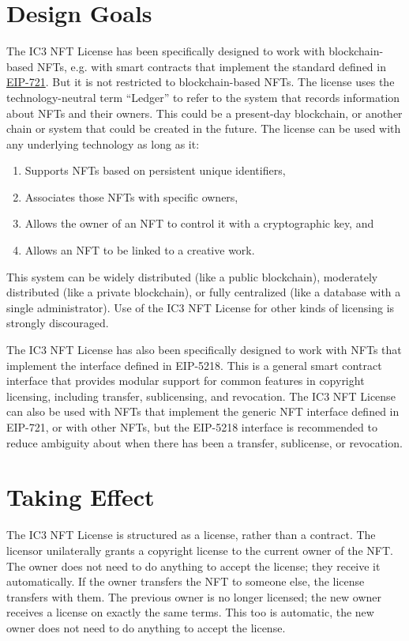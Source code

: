 \documentclass{article}
\newcommand{\eiplicense}{EIP-5218\xspace}
\newcommand{\iccclicense}{IC3 NFT License\xspace}
\begin{document}
\section{Design Goals}


The \iccclicense has been specifically designed to work with blockchain-based NFTs, e.g. with smart contracts that implement the standard defined in \href{https://eips.ethereum.org/EIPS/eip-721}{EIP-721}. But it is not restricted to blockchain-based NFTs. The license uses the technology-neutral term ``Ledger'' to refer to the system that records information about NFTs and their owners. This could be a present-day blockchain, or another chain or system that could be created in the future. The license can be used with any underlying technology as long as it:
\begin{enumerate}
\item Supports NFTs based on persistent unique identifiers, 
\item Associates those NFTs with specific owners,
\item Allows the owner of an NFT to control it with a cryptographic key, and 
\item Allows an NFT to be linked to a creative work. 
\end{enumerate}
This system can be widely distributed (like a public blockchain), moderately distributed (like a private blockchain), or fully centralized (like a database with a single administrator). Use of the \iccclicense for other kinds of licensing is strongly discouraged.

The \iccclicense has also been specifically designed to work with NFTs that implement the interface defined in \eiplicense. This is a general smart contract interface that provides modular support for common features in copyright licensing, including transfer, sublicensing, and revocation. The \iccclicense can also be used with NFTs that implement the generic NFT interface defined in EIP-721, or with other NFTs, but the \eiplicense interface is recommended to reduce ambiguity about when there has been a transfer, sublicense, or revocation.


\section{Taking Effect}

The \iccclicense is structured as a license, rather than a contract. The licensor unilaterally grants a copyright license to the current owner of the NFT. The owner does not need to do anything to accept the license; they receive it automatically. If the owner transfers the NFT to someone else, the license transfers with them. The previous owner is no longer licensed; the new owner receives a license on exactly the same terms. This too is automatic, the new owner does not need to do anything to accept the license.
\end{document}
